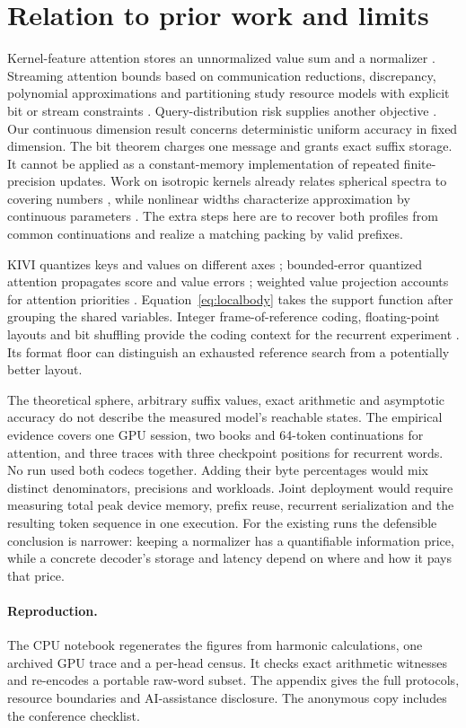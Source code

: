 \section{Relation to prior work and limits}\label{sec:scope}
Kernel-feature attention stores an unnormalized value sum and a normalizer \cite{kath,schlag}. Streaming attention bounds based on communication reductions, discrepancy, polynomial approximations and partitioning study resource models with explicit bit or stream constraints \cite{haris,balance,chen}. Query-distribution risk supplies another objective \cite{risk}. Our continuous dimension result concerns deterministic uniform accuracy in fixed dimension. The bit theorem charges one message and grants exact suffix storage. It cannot be applied as a constant-memory implementation of repeated finite-precision updates. Work on isotropic kernels already relates spherical spectra to covering numbers \cite{entropy}, while nonlinear widths characterize approximation by continuous parameters \cite{devore}. The extra steps here are to recover both profiles from common continuations and realize a matching packing by valid prefixes.

KIVI quantizes keys and values on different axes \cite{kivi}; bounded-error quantized attention propagates score and value errors \cite{calver}; weighted value projection accounts for attention priorities \cite{salfati}. Equation~\eqref{eq:localbody} takes the support function after grouping the shared variables. Integer frame-of-reference coding, floating-point layouts and bit shuffling provide the coding context for the recurrent experiment \cite{lemire,alp,shuffle}. Its format floor can distinguish an exhausted reference search from a potentially better layout.

The theoretical sphere, arbitrary suffix values, exact arithmetic and asymptotic accuracy do not describe the measured model's reachable states. The empirical evidence covers one GPU session, two books and 64-token continuations for attention, and three traces with three checkpoint positions for recurrent words. No run used both codecs together. Adding their byte percentages would mix distinct denominators, precisions and workloads. Joint deployment would require measuring total peak device memory, prefix reuse, recurrent serialization and the resulting token sequence in one execution. For the existing runs the defensible conclusion is narrower: keeping a normalizer has a quantifiable information price, while a concrete decoder's storage and latency depend on where and how it pays that price.

\paragraph{Reproduction.}
The CPU notebook regenerates the figures from harmonic calculations, one archived GPU trace and a per-head census. It checks exact arithmetic witnesses and re-encodes a portable raw-word subset. The appendix gives the full protocols, resource boundaries and AI-assistance disclosure. The anonymous copy includes the conference checklist.

